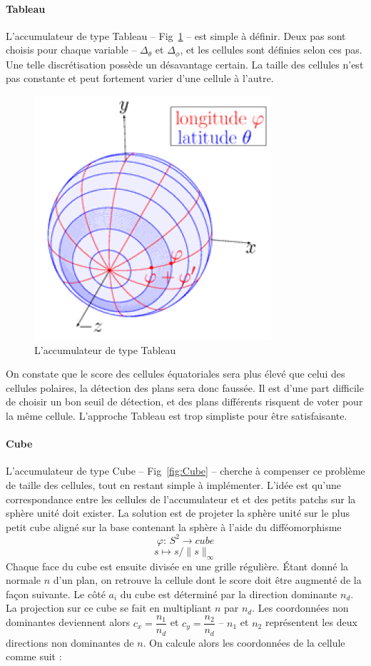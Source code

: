﻿\documentclass[12pt, twoside]{article}
\begin{document}
\paragraph{Tableau}
L’accumulateur de type Tableau -- Fig~\ref{fig:Array} -- est simple à définir. Deux pas sont choisis pour chaque variable -- $\Delta_{\theta}$ et $\Delta_{\phi}$, et les cellules sont définies selon ces pas. Une telle discrétisation possède un désavantage certain. La taille des cellules n’est pas constante et peut fortement varier d’une cellule à l’autre.

\begin{figure}[h]
\centering
\includegraphics[scale=0.65]{Array.png}
\caption{\label{fig:Array} L'accumulateur de type Tableau}
\end{figure}

On constate que le score des cellules équatoriales sera plus élevé que celui des cellules polaires, la détection des plans sera donc faussée. Il est d’une part difficile de choisir un bon seuil de détection, et des plans différents risquent de voter pour la même cellule. L’approche Tableau est trop simpliste pour être satisfaisante.

\paragraph{Cube}
L’accumulateur de type Cube -- Fig~\ref{fig:Cube} -- cherche à compenser ce problème de taille des cellules, tout en restant simple à implémenter. L’idée est qu’une correspondance entre les cellules de l’accumulateur et et des petits patchs sur la sphère unité doit exister. La solution est de projeter la sphère unité sur le plus petit cube aligné sur la base contenant la sphère à l’aide du difféomorphisme
$$\varphi \text{: } S^2 \rightarrow cube$$
$$s \mapsto s/\lVert s\rVert_{\infty}$$
Chaque face du cube est ensuite divisée en une grille régulière. Étant donné la normale $n$ d’un plan, on retrouve la cellule dont le score doit être augmenté de la façon suivante. Le côté $a_i$ du cube est déterminé par la direction dominante $n_d$. La projection sur ce cube se fait en multipliant $n$ par $n_d$. Les coordonnées non dominantes deviennent alors $c_x =
\dfrac{n_1}{n_d}$ et $c_y = \dfrac{n_2}{n_d}$ -- $n_1$ et $n_2$ représentent les deux directions non dominantes de $n$. On calcule alors les coordonnées de la cellule comme suit :
\end{document}
